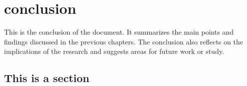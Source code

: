 \chapter{conclusion}
\label{chapter:conclusion}
This is the conclusion of the document. It summarizes the main points and findings discussed in the previous chapters. 
The conclusion also reflects on the implications of the research and suggests areas for future work or study.

\section{This is a section}
